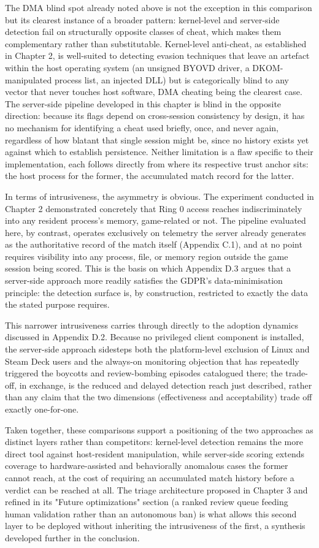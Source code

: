 The DMA blind spot already noted above is not the exception in this comparison but its clearest instance of a broader pattern: kernel-level and server-side detection fail on structurally opposite classes of cheat, which makes them complementary rather than substitutable. Kernel-level anti-cheat, as established in Chapter 2, is well-suited to detecting evasion techniques that leave an artefact within the host operating system (an unsigned BYOVD driver, a DKOM-manipulated process list, an injected DLL) but is categorically blind to any vector that never touches host software, DMA cheating being the clearest case. The server-side pipeline developed in this chapter is blind in the opposite direction: because its flags depend on cross-session consistency by design, it has no mechanism for identifying a cheat used briefly, once, and never again, regardless of how blatant that single session might be, since no history exists yet against which to establish persistence. Neither limitation is a flaw specific to their implementation, each follows directly from where its respective trust anchor sits: the host process for the former, the accumulated match record for the latter.

In terms of intrusiveness, the asymmetry is obvious. The experiment conducted in Chapter 2 demonstrated concretely that Ring 0 access reaches indiscriminately into any resident process's memory, game-related or not. The pipeline evaluated here, by contrast, operates exclusively on telemetry the server already generates as the authoritative record of the match itself (Appendix C.1), and at no point requires visibility into any process, file, or memory region outside the game session being scored. This is the basis on which Appendix D.3 argues that a server-side approach more readily satisfies the GDPR's data-minimisation principle: the detection surface is, by construction, restricted to exactly the data the stated purpose requires.

This narrower intrusiveness carries through directly to the adoption dynamics discussed in Appendix D.2. Because no privileged client component is installed, the server-side approach sidesteps both the platform-level exclusion of Linux and Steam Deck users and the always-on monitoring objection that has repeatedly triggered the boycotts and review-bombing episodes catalogued there; the trade-off, in exchange, is the reduced and delayed detection reach just described, rather than any claim that the two dimensions (effectiveness and acceptability) trade off exactly one-for-one.

Taken together, these comparisons support a positioning of the two approaches as distinct layers rather than competitors: kernel-level detection remains the more direct tool against host-resident manipulation, while server-side scoring extends coverage to hardware-assisted and behaviorally anomalous cases the former cannot reach, at the cost of requiring an accumulated match history before a verdict can be reached at all. The triage architecture proposed in Chapter 3 and refined in its "Future optimizations" section (a ranked review queue feeding human validation rather than an autonomous ban) is what allows this second layer to be deployed without inheriting the intrusiveness of the first, a synthesis developed further in the conclusion.
